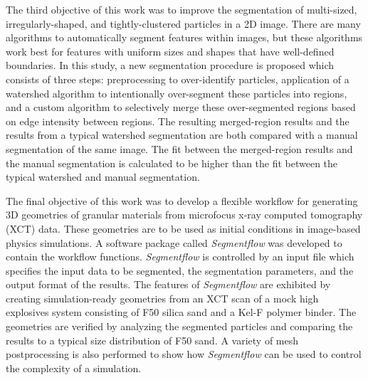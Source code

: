 The third objective of this work was to improve the segmentation of
multi-sized, irregularly-shaped, and tightly-clustered particles in a 2D
image. There are many algorithms to automatically segment features within
images, but these algorithms work best for features with uniform sizes and
shapes that have well-defined boundaries. In this study, a new
segmentation procedure is proposed which consists of three steps:
preprocessing to over-identify particles, application of a watershed
algorithm to intentionally over-segment these particles into regions, and
a custom algorithm to selectively merge these over-segmented regions based
on edge intensity between regions. The resulting merged-region results and
the results from a typical watershed segmentation are both compared with a
manual segmentation of the same image. The fit between the merged-region
results and the manual segmentation is calculated to be higher than the
fit between the typical watershed and manual segmentation.

The final objective of this work was to develop a flexible workflow for
generating 3D geometries of granular materials from microfocus x-ray
computed tomography (XCT) data. These geometries are to be used as initial
conditions in image-based physics simulations. A software package called
\textit{Segmentflow} was developed to contain the workflow functions.
\textit{Segmentflow}
is controlled by an input file which specifies the input data to be
segmented, the segmentation parameters, and the output format of the
results. The features of \textit{Segmentflow} are exhibited
by creating simulation-ready geometries from
an XCT scan of a mock high explosives system consisting of F50 silica sand 
and a Kel-F polymer binder.
The geometries are verified by analyzing the segmented particles and comparing
the results to a typical size distribution of F50 sand.
A variety of mesh postprocessing is also performed to show how
\textit{Segmentflow} can be used to control the complexity of a simulation.

